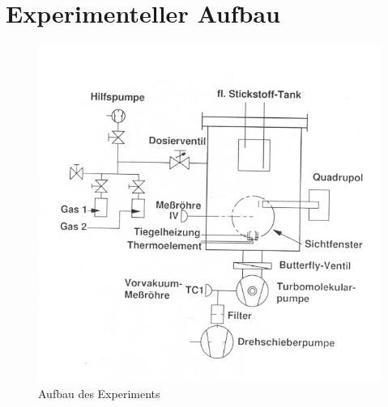 \chapter{Experimenteller Aufbau}
\begin{figure}
    \centering
    \includegraphics{Massenspektrometer/include/Massenspektrometer_Aufbau.png}
    \caption{Aufbau des Experiments}
    \label{fig:aufbau}
\end{figure}